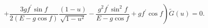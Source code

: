 \begin{equation}
\label{OD2}
\left.
+ \frac{3 g f^\prime \sin f}{2 \left(E - g \cos f \right)} 
\frac{(1-u)}{\sqrt{1-u^2}} 
- \frac{g^2 f^\prime \sin^2 f}{E - g \cos f} + g f^\prime \cos f
\right) {\tilde G}(u) = 0. 
\end{equation} 
